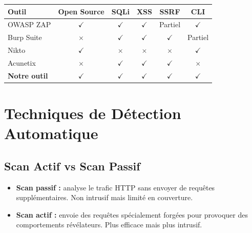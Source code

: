 \documentclass[12pt, a4paper]{report}
\begin{document}
\begin{center}
\begin{tabular}{l c c c c c}
  \toprule
  \textbf{Outil} & \textbf{Open Source} & \textbf{SQLi} & \textbf{XSS}
                 & \textbf{SSRF} & \textbf{CLI} \\
  \midrule
  OWASP ZAP    & \textcolor{lowgreen}{$\checkmark$} & \textcolor{lowgreen}{$\checkmark$}
               & \textcolor{lowgreen}{$\checkmark$} & Partiel
               & \textcolor{lowgreen}{$\checkmark$} \\
  Burp Suite   & \textcolor{accentred}{$\times$}  & \textcolor{lowgreen}{$\checkmark$}
               & \textcolor{lowgreen}{$\checkmark$} & \textcolor{lowgreen}{$\checkmark$}
               & Partiel \\
  Nikto        & \textcolor{lowgreen}{$\checkmark$} & \textcolor{accentred}{$\times$}
               & \textcolor{accentred}{$\times$}  & \textcolor{accentred}{$\times$}
               & \textcolor{lowgreen}{$\checkmark$} \\
  Acunetix     & \textcolor{accentred}{$\times$}  & \textcolor{lowgreen}{$\checkmark$}
               & \textcolor{lowgreen}{$\checkmark$} & \textcolor{lowgreen}{$\checkmark$}
               & \textcolor{accentred}{$\times$}  \\
  \textbf{Notre outil} & \textcolor{lowgreen}{$\checkmark$} & \textcolor{lowgreen}{$\checkmark$}
               & \textcolor{lowgreen}{$\checkmark$} & \textcolor{lowgreen}{$\checkmark$}
               & \textcolor{lowgreen}{$\checkmark$} \\
  \bottomrule
\end{tabular}
\end{center}

\section{Techniques de Détection Automatique}

\subsection{Scan Actif vs Scan Passif}

\begin{itemize}[leftmargin=2em, itemsep=4pt]
  \item \textbf{Scan passif :} analyse le trafic HTTP sans envoyer de requêtes
        supplémentaires. Non intrusif mais limité en couverture.
  \item \textbf{Scan actif :} envoie des requêtes spécialement forgées pour
        provoquer des comportements révélateurs. Plus efficace mais plus intrusif.
\end{itemize}
\end{document}
